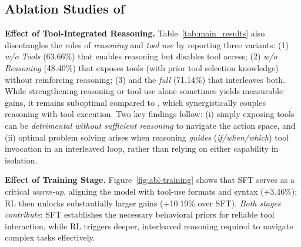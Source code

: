 \subsection{Ablation Studies of \ours{}}
\noindent \textbf{Effect of Tool-Integrated Reasoning.}
Table~\ref{tab:main_results} also disentangles the roles of \emph{reasoning} and \emph{tool use} by reporting three variants: 
(1) \emph{w/o Tools} (63.66\%) that enables reasoning but disables tool access; 
(2) \emph{w/o Reasoning} (48.40\%) that exposes tools (with prior tool selection knowledge) without reinforcing reasoning; 
(3) and the \emph{full} \ours{} (71.14\%) that interleaves both. 
While strengthening reasoning or tool-use alone sometimes yields measurable gains, it remains suboptimal compared to \ours{}, which synergistically couples reasoning with tool execution.
Two key findings follow:
(i) simply exposing tools can be \emph{detrimental without sufficient reasoning} to navigate the action space, and
(ii) optimal problem solving arises when reasoning \emph{guides} (\emph{if/when/which}) tool invocation in an interleaved loop, rather than relying on either capability in isolation.

\noindent \textbf{Effect of Training Stage.}
Figure~\ref{fig:abl-training} shows that SFT serves as a critical \emph{warm-up}, aligning the model with tool-use formats and syntax (+3.46\%); RL then unlocks substantially larger gains (+10.19\% over SFT).
\emph{Both stages contribute}: SFT establishes the necessary behavioral priors for reliable tool interaction, while RL triggers deeper, interleaved reasoning required to navigate complex tasks effectively.

